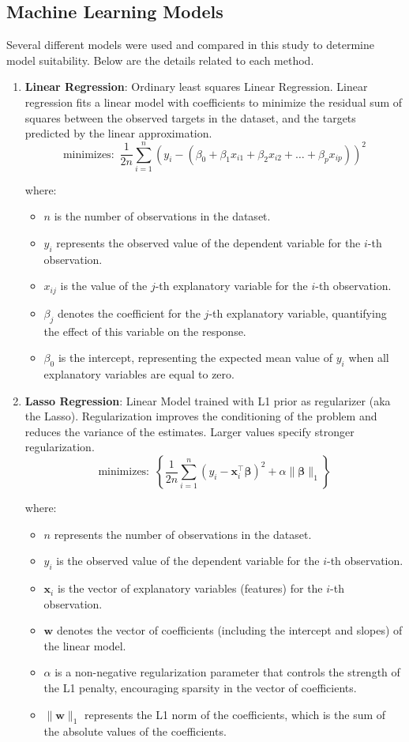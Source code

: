 \documentclass{article}
\theoremstyle{mytheoremstyle}
\theoremstyle{mytheoremstyle}
\theoremstyle{myproblemstyle}
\begin{document}
\subsection{Machine Learning Models}
Several different models were used and compared in this study to determine model suitability. Below are the details related to each method. 
\begin{enumerate}
    \item \textbf{Linear Regression}: Ordinary least squares Linear Regression. Linear regression fits a linear model with coefficients to minimize the residual sum of squares between the observed targets in the dataset, and the targets predicted by the linear approximation.
    \[
        \text{minimizes: } \, \frac{1}{2n} \sum_{i=1}^n \left(y_i - (\beta_0 + \beta_1 x_{i1} + \beta_2 x_{i2} + \dots + \beta_p x_{ip})\right)^2\]

where:
\begin{itemize}
    \item $n$ is the number of observations in the dataset.
    \item $y_i$ represents the observed value of the dependent variable for the $i$-th observation.
    \item $x_{ij}$ is the value of the $j$-th explanatory variable for the $i$-th observation.
    \item $\beta_j$ denotes the coefficient for the $j$-th explanatory variable, quantifying the effect of this variable on the response.
    \item $\beta_0$ is the intercept, representing the expected mean value of $y_i$ when all explanatory variables are equal to zero.
\end{itemize}


    \item \textbf{Lasso Regression}: Linear Model trained with L1 prior as regularizer (aka the Lasso). Regularization improves the conditioning of the problem and reduces the variance of the estimates. Larger values specify stronger regularization.
    \[
\text{minimizes: } \, \left\{ \frac{1}{2n} \sum_{i=1}^n (y_i - \mathbf{x}_i^\top \mathbf{\beta})^2 + \alpha \|\mathbf{\beta}\|_1 \right\}
\]

where:
\begin{itemize}
    \item $n$ represents the number of observations in the dataset.
    \item $y_i$ is the observed value of the dependent variable for the $i$-th observation.
    \item $\mathbf{x}_i$ is the vector of explanatory variables (features) for the $i$-th observation.
    \item $\mathbf{w}$ denotes the vector of coefficients (including the intercept and slopes) of the linear model.
    \item $\alpha$ is a non-negative regularization parameter that controls the strength of the L1 penalty, encouraging sparsity in the vector of coefficients.
    \item $\|\mathbf{w}\|_1$ represents the L1 norm of the coefficients, which is the sum of the absolute values of the coefficients.
\end{itemize}


\end{enumerate}
\end{document}
